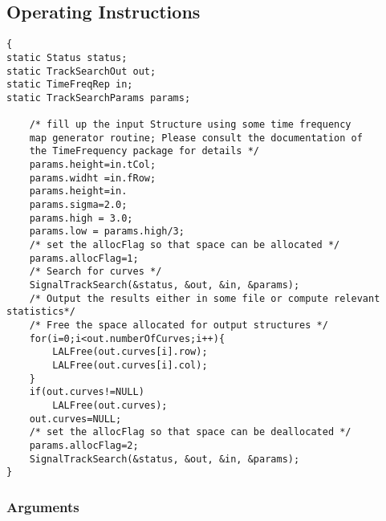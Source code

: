 \subsection{Operating Instructions}

\begin{verbatim}
{
static Status status;
static TrackSearchOut out;
static TimeFreqRep in;
static TrackSearchParams params;

    /* fill up the input Structure using some time frequency
    map generator routine; Please consult the documentation of
    the TimeFrequency package for details */
    params.height=in.tCol;
    params.widht =in.fRow;
    params.height=in.	
    params.sigma=2.0; 
    params.high = 3.0;
    params.low = params.high/3;
    /* set the allocFlag so that space can be allocated */
    params.allocFlag=1;    
    /* Search for curves */
    SignalTrackSearch(&status, &out, &in, &params);
    /* Output the results either in some file or compute relevant statistics*/
    /* Free the space allocated for output structures */
    for(i=0;i<out.numberOfCurves;i++){
        LALFree(out.curves[i].row);
        LALFree(out.curves[i].col);
    }
    if(out.curves!=NULL)
        LALFree(out.curves);
    out.curves=NULL;
    /* set the allocFlag so that space can be deallocated */
    params.allocFlag=2;    
    SignalTrackSearch(&status, &out, &in, &params);
}

\end{verbatim}
\subsubsection{Arguments}

